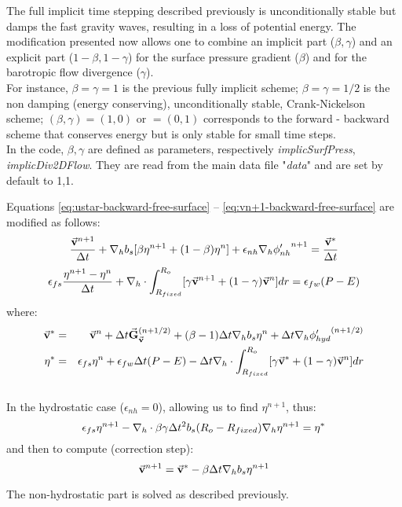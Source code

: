 The full implicit time stepping described previously is
unconditionally stable but damps the fast gravity waves, resulting in
a loss of potential energy.  The modification presented now allows one
to combine an implicit part ($\beta,\gamma$) and an explicit part
($1-\beta,1-\gamma$) for the surface pressure gradient ($\beta$) and
for the barotropic flow divergence ($\gamma$).
\\
For instance, $\beta=\gamma=1$ is the previous fully implicit scheme;
$\beta=\gamma=1/2$ is the non damping (energy conserving), unconditionally
stable, Crank-Nickelson scheme; $(\beta,\gamma)=(1,0)$ or $=(0,1)$
corresponds to the forward - backward scheme that conserves energy but is
only stable for small time steps.\\
In the code, $\beta,\gamma$ are defined as parameters, respectively 
{\it implicSurfPress}, {\it implicDiv2DFlow}. They are read from
the main data file "{\it data}" and are set by default to 1,1.

Equations \ref{eq:ustar-backward-free-surface} --
\ref{eq:vn+1-backward-free-surface} are modified as follows:
$$
\frac{ \vec{\bf v}^{n+1} }{ \Delta t }
+ {\bf \nabla}_h b_s [ \beta {\eta}^{n+1} + (1-\beta) {\eta}^{n} ] 
+ \epsilon_{nh} {\bf \nabla}_h {\phi'_{nh}}^{n+1}
 = \frac{ \vec{\bf v}^* }{ \Delta t }
$$
$$
\epsilon_{fs} \frac{ {\eta}^{n+1} - {\eta}^{n} }{ \Delta t}
+ {\bf \nabla}_h \cdot \int_{R_{fixed}}^{R_o} 
[ \gamma \vec{\bf v}^{n+1} + (1-\gamma) \vec{\bf v}^{n}] dr
= \epsilon_{fw} (P-E)
$$
where:
\begin{eqnarray*}
\vec{\bf v}^* & = &
\vec{\bf v} ^{n} + \Delta t \vec{\bf G}_{\vec{\bf v}} ^{(n+1/2)}
+ (\beta-1) \Delta t {\bf \nabla}_h b_s {\eta}^{n}
+ \Delta t {\bf \nabla}_h {\phi'_{hyd}}^{(n+1/2)}
\\
{\eta}^* & = &
\epsilon_{fs} {\eta}^{n} + \epsilon_{fw} \Delta t (P-E) 
- \Delta t {\bf \nabla}_h \cdot \int_{R_{fixed}}^{R_o} 
[ \gamma \vec{\bf v}^* + (1-\gamma) \vec{\bf v}^{n}] dr
\end{eqnarray*}
\\
In the hydrostatic case ($\epsilon_{nh}=0$), allowing us to find
${\eta}^{n+1}$, thus:
$$
\epsilon_{fs} {\eta}^{n+1} -
{\bf \nabla}_h \cdot \beta\gamma \Delta t^2 b_s (R_o - R_{fixed})
{\bf \nabla}_h {\eta}^{n+1}
= {\eta}^*
$$ 
and then to compute (correction step):
$$
\vec{\bf v}^{n+1} = \vec{\bf v}^{*}
- \beta \Delta t {\bf \nabla}_h b_s {\eta}^{n+1}
$$

The non-hydrostatic part is solved as described previously. 

